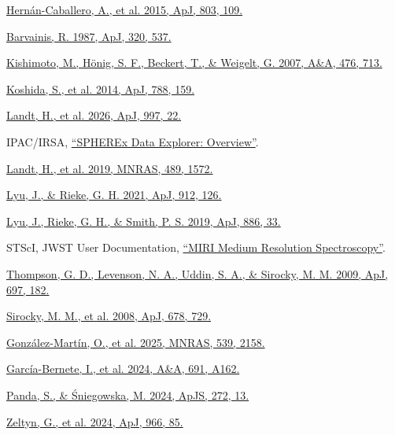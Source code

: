 \documentclass[12pt]{article}
\begin{document}
\noindent [16] \href{https://doi.org/10.1088/0004-637X/803/2/109}{Hern\'an-Caballero, A., et al. 2015, ApJ, 803, 109.}\par
\noindent [17] \href{https://articles.adsabs.harvard.edu/pdf/1987ApJ...320..537B}{Barvainis, R. 1987, ApJ, 320, 537.}\par
\noindent [18] \href{https://doi.org/10.1051/0004-6361:20077911}{Kishimoto, M., H\"onig, S. F., Beckert, T., \& Weigelt, G. 2007, A\&A, 476, 713.}\par
\noindent [19] \href{https://arxiv.org/abs/1406.2078}{Koshida, S., et al. 2014, ApJ, 788, 159.}\par
\noindent [20] \href{https://arxiv.org/abs/2510.21395}{Landt, H., et al. 2026, ApJ, 997, 22.}\par
\noindent [21] IPAC/IRSA, \href{https://irsa.ipac.caltech.edu/onlinehelp/spherex/spherex/overview.html}{``SPHEREx Data Explorer: Overview''}.\par
\noindent [22] \href{https://arxiv.org/abs/1908.01627}{Landt, H., et al. 2019, MNRAS, 489, 1572.}\par
\noindent [23] \href{https://doi.org/10.3847/1538-4357/abee14}{Lyu, J., \& Rieke, G. H. 2021, ApJ, 912, 126.}\par
\noindent [24] \href{https://doi.org/10.3847/1538-4357/ab481d}{Lyu, J., Rieke, G. H., \& Smith, P. S. 2019, ApJ, 886, 33.}\par
\noindent [25] STScI, JWST User Documentation, \href{https://jwst-docs.stsci.edu/jwst-mid-infrared-instrument/miri-observing-modes/miri-medium-resolution-spectroscopy}{``MIRI Medium Resolution Spectroscopy''}.\par
\noindent [26] \href{https://doi.org/10.1088/0004-637X/697/1/182}{Thompson, G. D., Levenson, N. A., Uddin, S. A., \& Sirocky, M. M. 2009, ApJ, 697, 182.}\par
\noindent [27] \href{https://doi.org/10.1086/586727}{Sirocky, M. M., et al. 2008, ApJ, 678, 729.}\par
\noindent [28] \href{https://arxiv.org/abs/2504.01103}{Gonz\'alez-Mart\'in, O., et al. 2025, MNRAS, 539, 2158.}\par
\noindent [29] \href{https://doi.org/10.1051/0004-6361/202450086}{Garc\'ia-Bernete, I., et al. 2024, A\&A, 691, A162.}\par
\noindent [30] \href{https://arxiv.org/abs/2206.10056}{Panda, S., \& \'Sniegowska, M. 2024, ApJS, 272, 13.}\par
\noindent [31] \href{https://arxiv.org/abs/2401.01933}{Zeltyn, G., et al. 2024, ApJ, 966, 85.}\par
\end{document}
